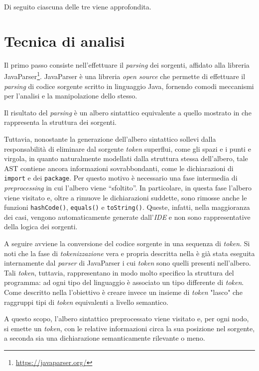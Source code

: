 Di seguito ciascuna delle tre viene approfondita.

\section{Tecnica di analisi}
Il primo passo consiste nell'effettuare il \textit{parsing} dei sorgenti, affidato alla libreria JavaParser\footnote{\url{https://javaparser.org/}}.
%
JavaParser è una libreria \textit{open source} che permette di effettuare il \textit{parsing} di codice sorgente scritto in linguaggio Java, fornendo comodi meccanismi per l'analisi e la manipolazione dello stesso.

Il risultato del \textit{parsing} è un albero sintattico equivalente a quello mostrato in  che rappresenta la struttura dei sorgenti.

Tuttavia, nonostante la generazione dell'albero sintattico sollevi dalla responsabilità di eliminare dal sorgente \textit{token} superflui, come gli spazi e i punti e virgola, in quanto naturalmente modellati dalla struttura stessa dell'albero, tale AST contiene ancora informazioni sovrabbondanti, come le dichiarazioni di \texttt{import} e dei \texttt{package}.
%
Per questo motivo è necessario una fase intermedia di \textit{preprocessing} in cui l'albero viene “sfoltito”. In particolare, in questa fase l'albero viene visitato e, oltre a rimuove le dichiarazioni suddette, sono rimosse anche le funzioni \texttt{hashCode()}, \texttt{equals()} e \texttt{toString()}.
%
Queste, infatti, nella maggioranza dei casi, vengono automaticamente generate dall'\textit{IDE} e non sono rappresentative della logica dei sorgenti.

A seguire avviene la conversione del codice sorgente in una sequenza di \textit{token}.
%
Si noti che la fase di \textit{tokenizzazione} vera e propria descritta nella  è già stata eseguita internamente dal \textit{parser} di JavaParser i cui \textit{token} sono quelli presenti nell'albero.
%
Tali \textit{token}, tuttavia, rappresentano in modo molto specifico la struttura del programma: ad ogni tipo del linguaggio è associato un tipo differente di \textit{token}.
%
Come descritto nella  l'obiettivo è creare invece un insieme di \textit{token} "lasco" che raggruppi tipi di \textit{token} equivalenti a livello semantico.

A questo scopo, l'albero sintattico preprocessato viene visitato e, per ogni nodo, si emette un \textit{token}, con le relative informazioni circa la sua posizione nel sorgente, a seconda sia una dichiarazione semanticamente rilevante o meno.

